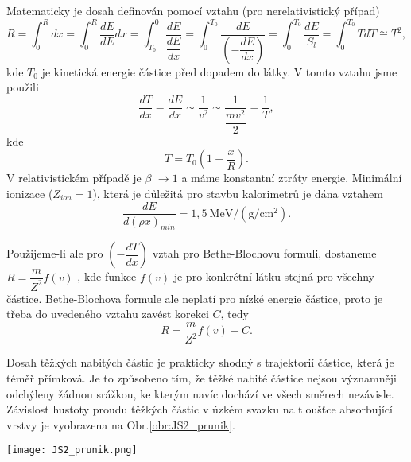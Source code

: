 \documentclass[../../main.tex]{subfiles}
\begin{document}
Matematicky je dosah definován pomocí vztahu (pro nerelativistický případ)
\begin{equation}
R = \int_{0}^{R} dx = \int_{0}^{R} \dfrac{dE}{dE} dx = \int_{T_0}^{0} \dfrac{dE}{\dfrac{dE}{dx}} = \int_{0}^{T_0} \dfrac{dE}{\left( - \dfrac{dE}{dx}\right) } = \int_{0}^{T_0} \dfrac{dE}{S_l} = \int_{0}^{T_0} T dT \cong T^2,
\end{equation}
kde $T_0$ je kinetická energie částice před dopadem do látky. V tomto vztahu jsme použili
\begin{equation}
\dfrac{dT}{dx} = \dfrac{dE}{dx} \sim \dfrac{1}{v^2} \sim \dfrac{1}{\dfrac{mv^2}{2}} = \dfrac{1}{T},
\end{equation}
kde
\begin{equation}
T = T_0 \left( 1 - \dfrac{x}{R}\right) .
\end{equation}
V relativistickém případě je $\beta$ $\rightarrow 1$ a máme konstantní ztráty energie. Minimální ionizace ($Z_{ion} = 1$), která je důležitá pro stavbu kalorimetrů je dána vztahem
\begin{equation}
\dfrac{dE}{d(\rho x)_{min}} = 1,5 ~\mathrm{MeV/(g/cm^2)}.
\end{equation}

 Použijeme-li ale pro $\left( - \dfrac{dT}{dx}\right) $ vztah pro Bethe-Blochovu formuli, dostaneme $R = \dfrac{m}{Z^2}f(v)$ , kde funkce $f(v)$ je pro konkrétní látku stejná pro všechny částice. Bethe-Blochova formule ale neplatí pro nízké energie částice, proto je třeba do uvedeného vztahu zavést korekci $C$, tedy
\begin{equation}
R = \dfrac{m}{Z^2} f(v) + C.
\end{equation}

Dosah těžkých nabitých částic je prakticky shodný s trajektorií částice, která je téměř přímková. Je to způsobeno tím, že těžké nabité částice nejsou významněji odchýleny žádnou srážkou, ke kterým navíc dochází ve všech směrech nezávisle. Závislost hustoty proudu těžkých částic v úzkém svazku na tloušťce absorbující vrstvy je vyobrazena na Obr.\ref{obr:JS2_prunik}.

\begin{center}
	\texttt{[image: JS2\_prunik.png]}
\end{center}
\end{document}
